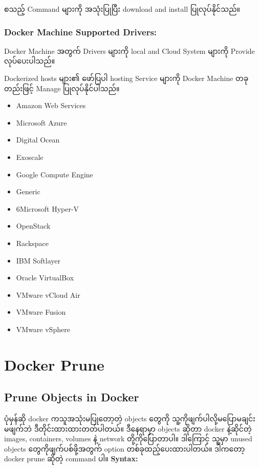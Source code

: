 စသည့် Command များကို အသုံးပြုပြီး download and install ပြုလုပ်နိုင်သည်။

\hypertarget{docker-machine-supported-drivers-1}{%
\subsubsection{Docker Machine Supported
Drivers:}\label{docker-machine-supported-drivers-1}}

Docker Machine အတွက် Drivers များကို local and Cloud System များကို
Provide လုပ်ပေးပါသည်။

Dockerized hosts များ၏ ဖော်ပြပါ hosting Service များကို Docker Machine
တခုတည်းဖြင့် Manage ပြုလုပ်နိုင်ပါသည်။

\begin{itemize}
\tightlist
\item
  Amazon Web Services
\item
  Microsoft Azure
\item
  Digital Ocean
\item
  Exoscale
\item
  Google Compute Engine
\item
  Generic
\item
  6Microsoft Hyper-V
\item
  OpenStack
\item
  Rackspace
\item
  IBM Softlayer
\item
  Oracle VirtualBox
\item
  VMware vCloud Air
\item
  VMware Fusion
\item
  VMware vSphere
\end{itemize}

\pagebreak

\hypertarget{docker-prune-1}{%
\section{Docker Prune}\label{docker-prune-1}}

\hypertarget{prune-objects-in-docker-1}{%
\subsection{Prune Objects in Docker}\label{prune-objects-in-docker-1}}

ပုံမှန်ဆို docker ကသူအသုံးမပြုတော့တဲ့ objects ‌တွေကို
သူ့ကိုဖျက်ပါလို့မပြောမချင်း မဖျက်ဘဲ ဒီတိုင်းထားထားတတ်ပါတယ်။ ဒီနေရာမှာ
objects ဆိုတာ docker နဲ့ဆိုင်တဲ့ images, containers, volumes နဲ့ network
တို့ကိုပြောတာပါ။ ဒါကြောင့် သူ့မှာ unused objects တွေကိုဖျက်ပစ်ဖို့အတွက်
option တစ်ခုထည့်ပေးထားပါတယ်။ ဒါကတော့ docker prune ဆိုတဲ့ command ပါ။
\textbf{Syntax:}

